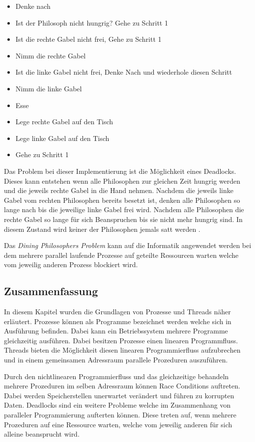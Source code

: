 \begin{itemize}
  \item Denke nach
  \item Ist der Philosoph nicht hungrig? Gehe zu Schritt 1
  \item Ist die rechte Gabel nicht frei, Gehe zu Schritt 1
  \item Nimm die rechte Gabel
  \item Ist die linke Gabel nicht frei, Denke Nach und wiederhole diesen Schritt
  \item Nimm die linke Gabel
  \item Esse
  \item Lege rechte Gabel auf den Tisch  
  \item Lege linke Gabel auf den Tisch
  \item Gehe zu Schritt 1
\end{itemize}

Das Problem bei dieser Implementierung ist die Möglichkeit eines Deadlocks. Dieses kann entstehen wenn alle Philosophen zur gleichen Zeit hungrig werden und die jeweils rechte Gabel in die Hand nehmen. Nachdem die jeweils linke Gabel vom rechten Philosophen bereits besetzt ist, denken alle Philosophen so lange nach bis die jeweilige linke Gabel frei wird. Nachdem alle Philosophen die rechte Gabel so lange für sich Beanspruchen bis sie nicht mehr hungrig sind. In diesem Zustand wird keiner der Philosophen jemals satt werden \cite[p. 21]{dij71}. 

Das \emph{Dining Philosophers Problem} kann auf die Informatik angewendet werden bei dem mehrere parallel laufende Prozesse auf geteilte Ressourcen warten welche vom jeweilig anderen Prozess blockiert wird.

\subsection{Zusammenfassung}
In diesem Kapitel wurden die Grundlagen von Prozesse und Threads näher erläutert. Prozesse können als Programme bezeichnet werden welche sich in Ausführung befinden. Dabei kann ein Betriebssystem mehrere Programme gleichzeitig ausführen. Dabei besitzen Prozesse einen linearen Programmfluss. Threads bieten die Möglichkeit diesen linearen Programmierfluss aufzubrechen und in einem gemeinsamen Adressraum parallele Prozeduren auszuführen. 

Durch den nichtlinearen Programmierfluss und das gleichzeitige behandeln mehrere Prozeduren im selben Adressraum können Race Conditions auftreten. Dabei werden Speicherstellen unerwartet verändert und führen zu korrupten Daten. Deadlocks sind ein weitere Probleme welche im Zusammenhang von paralleler Programmierung aufterten können. Diese treten auf, wenn mehrere Prozeduren auf eine Ressource warten, welche vom jeweilig anderen für sich alleine beansprucht wird. 